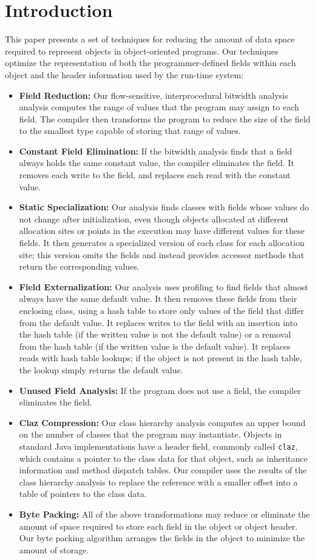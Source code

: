 \documentclass[oribibl]{llncs}
\begin{document}
\section{Introduction}
%
This paper presents a set of techniques for reducing the
amount of data space required to represent objects
in object-oriented programs. Our techniques optimize
the representation of both the programmer-defined fields
within each object and the header information used by the
run-time system:
\begin{itemize}
\item {\bf Field Reduction:} 
Our flow-sensitive, interprocedural bitwidth analysis
analysis computes the range of values that the program
may assign to each field. The compiler then transforms the program
to reduce the size of the field to the smallest type
capable of storing that range of values. 
\item {\bf Constant Field Elimination:} 
If the bitwidth analysis finds that a field always holds
the same constant value, the compiler eliminates the field. 
It removes each write to the field, and replaces each read
with the constant value.
\item {\bf Static Specialization:} Our analysis finds 
classes with fields whose values do not change after initialization,
even though objects allocated at different allocation sites
or points in the execution may
have different values for these fields. It then generates 
a specialized version of each class for each allocation site;
this version omits the fields and instead provides accessor
methods that return the corresponding values. 
\item {\bf Field Externalization:} Our analysis uses profiling
to find fields that almost always have the same default value. 
It then removes these fields from their enclosing class, 
using a hash table to store only values of the field that differ
from the default value. It replaces writes to the field with
an insertion into the hash table (if the written value is not the
default value) or a removal from the hash table (if the written value
is the default value). It replaces reads with hash table lookups; 
if the object is not present in the hash table, the lookup simply
returns the default value. 
\item {\bf Unused Field Analysis:} If the program does not
use a field, the compiler eliminates the field. 
\item {\bf Claz Compression:} Our class hierarchy analysis
computes an upper bound on the number of classes that the
program may instantiate. Objects in standard 
Java implementations have a header field, commonly called {\tt claz},
which contains a pointer
to the class data for that object,
such as inheritance information and method dispatch tables.
Our compiler uses the results of the class
hierarchy analysis to replace the reference with a smaller
offset into a table of pointers to the class data. 
\item {\bf Byte Packing:} All of the above transformations may
reduce or eliminate the amount of space required to store each
field in the object or object header. Our byte packing algorithm
arranges the fields in the object to minimize the amount of 
storage. 
\end{itemize}
\end{document}
